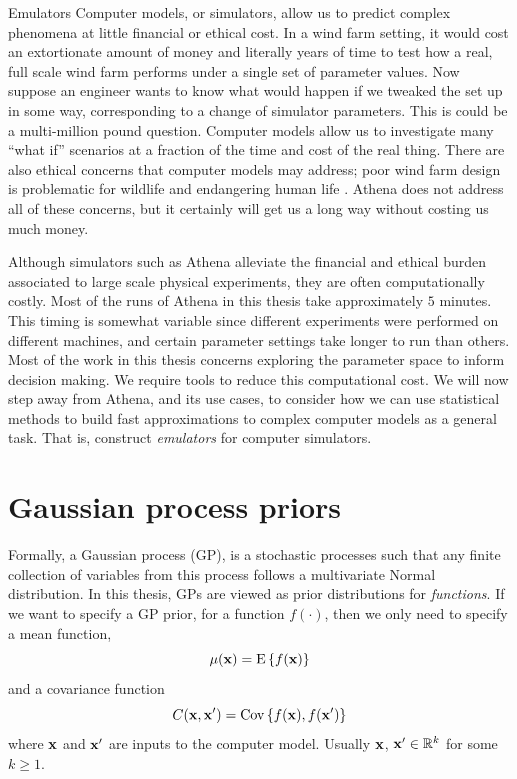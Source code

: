 \begin{chapter}{Emulators \label{Ch:Emulators}}
Computer models, or simulators, allow us to predict complex phenomena at little financial or ethical cost. In a wind farm setting, it would cost an extortionate amount of money and literally years of time to test how a real, full scale wind farm performs under a single set of parameter values. Now suppose an engineer wants to know what would happen if we tweaked the set up in some way, corresponding to a change of simulator parameters. This is could be a multi-million pound question. Computer models allow us to investigate many ``what if'' scenarios at a fraction of the time and cost of the real thing. There are also ethical concerns that computer models may address; poor wind farm design is problematic for wildlife and endangering human life \citep{Bailey2014, Pedersen2020}. Athena does not address all of these concerns, but it certainly will get us a long way without costing us much money.

Although simulators such as Athena alleviate the financial and ethical burden associated to large scale physical experiments, they are often computationally costly. Most of the runs of Athena in this thesis take approximately $5$ minutes. This timing is somewhat variable since different experiments were performed on different machines, and certain parameter settings take longer to run than others. Most of the work in this thesis concerns exploring the parameter space to inform decision making. We require tools to reduce this computational cost. We will now step away from Athena, and its use cases, to consider how we can use statistical methods to build fast approximations to complex computer models as a general task. That is, construct \textit{emulators} for computer simulators.
\section{Gaussian process priors}
Formally, a Gaussian process (GP), is a stochastic processes such that any finite collection of variables from this process follows a multivariate Normal distribution. In this thesis, GPs are viewed as prior distributions for \textit{functions}. If we want to specify a GP prior, for a function $f(\cdot)$, then we only need to specify a mean function,
\begin{equation}
  \mu(\mathbf{x}) = \textrm{E}\, \{ f(\mathbf{x}) \}
\end{equation} and a covariance function
 \begin{equation}
   C(\mathbf{x}, \mathbf{x}') = \mathrm{Cov}\,\{ f(\mathbf{x}), f(\mathbf{x}')\}
 \end{equation}
where $\mathbf{x}$ and $\mathbf{x}'$ are inputs to the computer model. Usually $\mathbf{x}$, $\mathbf{x}' \in \mathbb{R}^k$ for some $k \geq 1$.


\end{chapter}
